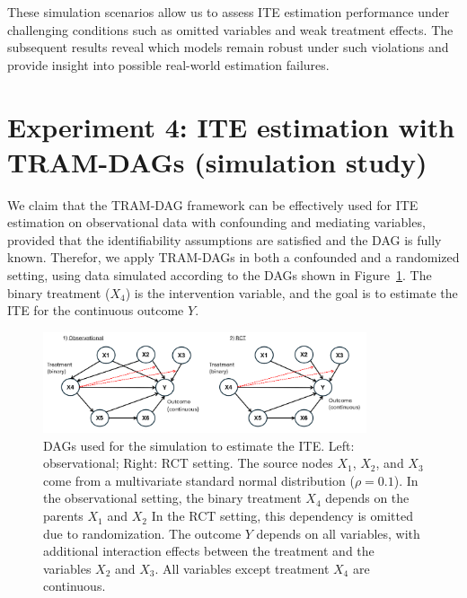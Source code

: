 These simulation scenarios allow us to assess ITE estimation performance under challenging conditions such as omitted variables and weak treatment effects. The subsequent results reveal which models remain robust under such violations and provide insight into possible real-world estimation failures.











\section{Experiment 4: ITE estimation with TRAM-DAGs (simulation study)} \label{sec:methods_experiment4}


We claim that the TRAM-DAG framework can be effectively used for ITE estimation on observational data with confounding and mediating variables, provided that the identifiability assumptions are satisfied and the DAG is fully known. Therefor, we apply TRAM-DAGs in both a confounded and a randomized setting, using data simulated according to the DAGs shown in Figure~\ref{fig:ite_dag_observational}. The binary treatment ($X_4$) is the intervention variable, and the goal is to estimate the ITE for the continuous outcome $Y$.


\begin{figure}[H]
\centering
\includegraphics[width=0.85\textwidth]{img/exp4_dags.png}
\caption{DAGs used for the simulation to estimate the ITE. Left: observational; Right: RCT setting. The source nodes $X_1$, $X_2$, and $X_3$ come from a multivariate standard normal distribution ($\rho=0.1$). In the observational setting, the binary treatment $X_4$ depends on the parents $X_1$ and $X_2$ In the RCT setting, this dependency is omitted due to randomization. The outcome $Y$ depends on all variables, with additional interaction effects between the treatment and the variables $X_2$ and $X_3$. All variables except treatment $X_4$ are continuous.}
\label{fig:ite_dag_observational}
\end{figure}


